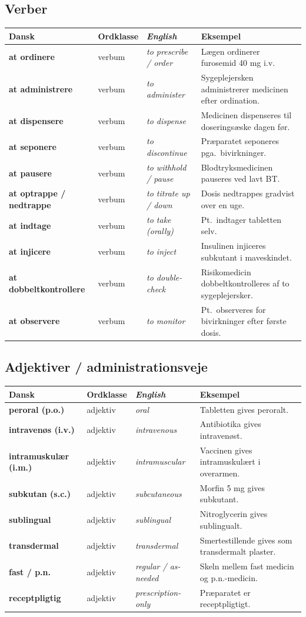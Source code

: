 \documentclass[11pt,a4paper]{report}
\makeatletter
\newcommand{\eng}[1]{\textcolor{en}{\itshape #1}}       %
\newcommand{\da}[1]{\textbf{#1}}
\newenvironment{glos}{%
  \small\renewcommand{\arraystretch}{1.35}
  \begin{longtable}{@{}>{\raggedright\arraybackslash}p{3.3cm}
                        >{\raggedright\arraybackslash}p{1.7cm}
                        >{\raggedright\arraybackslash}p{3.2cm}
                        >{\raggedright\arraybackslash}p{6.0cm}@{}}
  \toprule
  \textbf{Dansk} & \textbf{Ordklasse} & \eng{English} & \textbf{Eksempel} \\ \midrule
  \endhead
}{\bottomrule\end{longtable}}
\makeatother
\begin{document}
\subsection{Verber}
\begin{glos}
\da{at ordinere} & verbum & \eng{to prescribe / order} & Lægen ordinerer furosemid 40 mg i.v. \\
\da{at administrere} & verbum & \eng{to administer} & Sygeplejersken administrerer medicinen efter ordination. \\
\da{at dispensere} & verbum & \eng{to dispense} & Medicinen dispenseres til doseringsæske dagen før. \\
\da{at seponere} & verbum & \eng{to discontinue} & Præparatet seponeres pga.\ bivirkninger. \\
\da{at pausere} & verbum & \eng{to withhold / pause} & Blodtryksmedicinen pauseres ved lavt BT. \\
\da{at optrappe / nedtrappe} & verbum & \eng{to titrate up / down} & Dosis nedtrappes gradvist over en uge. \\
\da{at indtage} & verbum & \eng{to take (orally)} & Pt.\ indtager tabletten selv. \\
\da{at injicere} & verbum & \eng{to inject} & Insulinen injiceres subkutant i maveskindet. \\
\da{at dobbeltkontrollere} & verbum & \eng{to double-check} & Risikomedicin dobbeltkontrolleres af to sygeplejersker. \\
\da{at observere} & verbum & \eng{to monitor} & Pt.\ observeres for bivirkninger efter første dosis. \\
\end{glos}

\subsection{Adjektiver / administrationsveje}
\begin{glos}
\da{peroral (p.o.)} & adjektiv & \eng{oral} & Tabletten gives peroralt. \\
\da{intravenøs (i.v.)} & adjektiv & \eng{intravenous} & Antibiotika gives intravenøst. \\
\da{intramuskulær (i.m.)} & adjektiv & \eng{intramuscular} & Vaccinen gives intramuskulært i overarmen. \\
\da{subkutan (s.c.)} & adjektiv & \eng{subcutaneous} & Morfin 5 mg gives subkutant. \\
\da{sublingual} & adjektiv & \eng{sublingual} & Nitroglycerin gives sublingualt. \\
\da{transdermal} & adjektiv & \eng{transdermal} & Smertestillende gives som transdermalt plaster. \\
\da{fast / p.n.} & adjektiv & \eng{regular / as-needed} & Skeln mellem fast medicin og p.n.-medicin. \\
\da{receptpligtig} & adjektiv & \eng{prescription-only} & Præparatet er receptpligtigt. \\
\end{glos}
\end{document}
